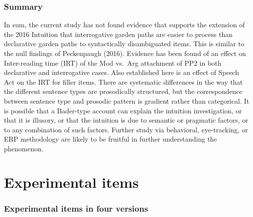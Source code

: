 \documentclass[11pt,oneside]{book}
\begin{document}
\hypertarget{summary-1}{%
\subsection{Summary}\label{summary-1}}

In sum, the current study has not found evidence that supports the extension of the 2016 Intuition that interrogative garden paths are easier to process than declarative garden paths to syntactically disambiguated items. This is similar to the null findings of Peckenpaugh (2016). Evidence has been found of an effect on Inter-reading time (IRT) of the Mod vs.~Arg attachment of PP2 in both declarative and interrogative cases. Also established here is an effect of Speech Act on the IRT for filler items. There are systematic differences in the way that the different sentence types are prosodically structured, but the correspondence between sentence type and prosodic pattern is gradient rather than categorical. It is possible that a Bader-type account can explain the intuition investigation, or that it is illusory, or that the intuition is due to semantic or pragmatic factors, or to any combination of such factors. Further study via behavioral, eye-tracking, or ERP methodology are likely to be fruitful in further understanding the phenomenon.

\singlespacing

\newpage

\hypertarget{appendix-appendices}{%
\appendix}


\hypertarget{appExp}{%
\chapter{Experimental items}\label{appExp}}

\hypertarget{experimental-items-in-four-versions}{%
\subsection*{Experimental items in four versions}\label{experimental-items-in-four-versions}}
\end{document}
